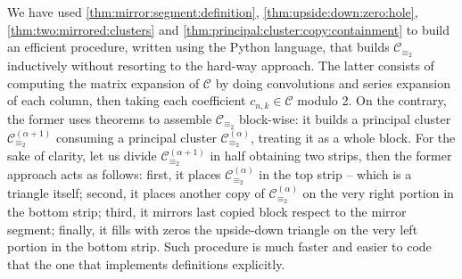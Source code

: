 We have used \autoref{thm:mirror:segment:definition},
\autoref{thm:upside:down:zero:hole}, \autoref{thm:two:mirrored:clusters} and
\autoref{thm:principal:cluster:copy:containment} to build an efficient
procedure, written using the Python language, that builds $\mathcal{C}_{\equiv_{2}}$
inductively without resorting to the hard-way approach. The latter consists of
computing the matrix expansion of $\mathcal{C}$ by doing convolutions and
series expansion of each column, then taking each coefficient $c_{n,k}\in\mathcal{C}$ modulo 2.
On the contrary, the former uses theorems to
assemble $\mathcal{C}_{\equiv_{2}}$ block-wise: it builds a principal cluster
$\mathcal{C}_{\equiv_{2}}^{(\alpha+1)}$ consuming a principal cluster
$\mathcal{C}_{\equiv_{2}}^{(\alpha)}$, treating it as a whole block. For the sake of clarity,
let us divide $\mathcal{C}_{\equiv_{2}}^{(\alpha+1)}$ in half obtaining two strips, then the former approach acts as follows:
first, it places $\mathcal{C}_{\equiv_{2}}^{(\alpha)}$ in the top strip -- which is a triangle itself;
second, it places another copy of $\mathcal{C}_{\equiv_{2}}^{(\alpha)}$ on the very right portion in the bottom strip;
third, it mirrors last copied block respect to the mirror segment;
finally, it fills with zeros the upside-down triangle on the very left portion in the bottom strip.
Such procedure is much faster and easier to code that the one that implements definitions explicitly.
